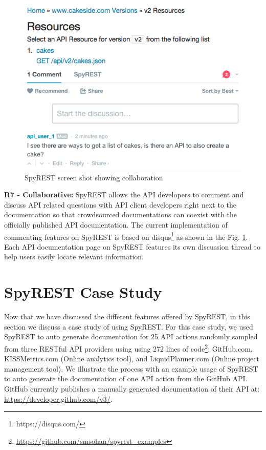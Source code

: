 \documentclass[conference]{IEEEtran}
\begin{document}
\begin{figure}[!tbh]
  \centering
  \includegraphics[width=\linewidth]{comments.png}
  \caption{SpyREST screen shot showing collaboration}
  \label{fig:comments}
\end{figure}


\textbf{R7 - Collaborative:} SpyREST allows the API developers to comment and discuss API related questions with API client developers right next to the documentation so that crowdsourced documentations can coexist with the officially published API documentation. The current implementation of commenting features on SpyREST is based on disqus\footnote{https://disqus.com/} as shown in the Fig. \ref{fig:comments}. Each API documentation page on SpyREST features its own discussion thread to help users easily locate relevant information.

\section{SpyREST Case Study}
\label{sec:case_study}
Now that we have discussed the different features offered by SpyREST, in this section we discuss a case study of using SpyREST. For this case study, we used SpyREST to auto generate documentation for 25 API actions randomly sampled from three RESTful API providers using using 272 lines of code\footnote{\url{https://github.com/smsohan/spyrest_examples}}: GitHub.com, KISSMetrics.com (Online analytics tool), and LiquidPlanner.com (Online project management tool). We illustrate the process with an example usage of SpyREST to auto generate the documentation of one API action from the GitHub API. GitHub currently publishes a manually generated documentation of their API at: \url{https://developer.github.com/v3/}.
\end{document}
